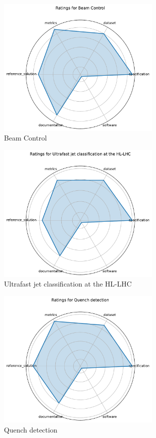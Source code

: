 \documentclass{article}
\begin{document}
\begin{figure}[h!]
  \centering
  \includegraphics[width=0.7\textwidth]{Beam Control_radar.pdf}
  \caption{Beam Control}
\end{figure}

\begin{figure}[h!]
  \centering
  \includegraphics[width=0.7\textwidth]{Ultrafast jet classification at the HL-LHC_radar.pdf}
  \caption{Ultrafast jet classification at the HL-LHC}
\end{figure}

\begin{figure}[h!]
  \centering
  \includegraphics[width=0.7\textwidth]{Quench detection_radar.pdf}
  \caption{Quench detection}
\end{figure}
\end{document}
